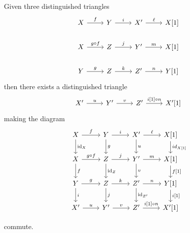 \documentclass[dissertation.tex]{subfiles}
\begin{document}
\begin{defn}
\begin{description}[style=nextline]
    \item[TR4]\label{TR4}
      Given three distinguished triangles
      $$\begin{tikzcd}
        X \arrow{r}{f} & Y \arrow{r}{i} & X^\prime \arrow{r}{\ell} & X[1]\\
        X \arrow{r}{g \circ f} & Z \arrow{r}{j} & Y^\prime \arrow{r}{m} & X[1]\\
        Y \arrow{r}{g} & Z \arrow{r}{k} & Z^\prime \arrow{r}{n} & Y[1]
      \end{tikzcd}$$
      then there exists a distinguished triangle
      $$\begin{tikzcd}
        X^\prime \arrow{r}{u} & Y^\prime \arrow{r}{v} & Z^\prime \arrow{r}{i[1]\circ n} & X^\prime[1]
      \end{tikzcd}$$
      making the diagram
      $$\begin{tikzcd}
        X\arrow{d}{\id_X}\arrow{r}{f} & Y\arrow{r}{i}\arrow{d}{g} & X^\prime\arrow{r}{\ell}\arrow{d}{u} & X[1]\arrow{d}{id_{X[1]}}\\
        X \arrow{d}{f}\arrow{r}{g \circ f} & Z\arrow{r}{j}\arrow{d}{\id_Z} & Y^\prime\arrow{r}{m}\arrow{d}{v} & X[1]\arrow{d}{f[1]}\\
        Y\arrow{r}{g}\arrow{d}{i} & Z \arrow{r}{k}\arrow{d}{j} & Z^\prime \arrow{r}{n}\arrow{d}{\id_{Z^\prime}} & Y[1]\arrow{d}{i[1]}\\
        X^\prime \arrow{r}{u} & Y^\prime \arrow{r}{v} & Z^\prime \arrow{r}{i[1] \circ n} & X^\prime[1]
      \end{tikzcd}$$
  \end{description}
\end{defn}
commute.
\end{document}
